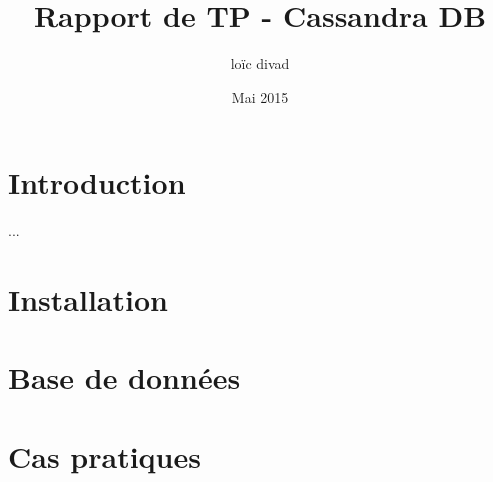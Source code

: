 \documentclass{article}
\title{Rapport de TP - Cassandra DB}
\author{loïc divad}
\date{Mai 2015}
\begin{document}
\maketitle

\section{Introduction}
...

\section{Installation}





\section{Base de données}



\section{Cas pratiques}


\end{document}
